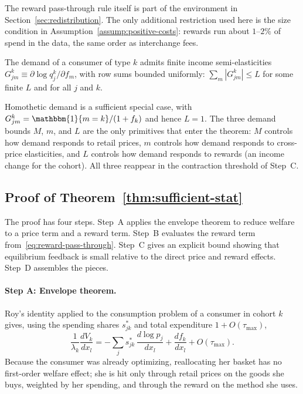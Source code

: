 \documentclass[main.tex]{subfiles}
\begin{document}
The reward pass-through rule itself is part of the environment in Section~\ref{sec:redistribution}.
The only additional restriction used here is the size condition in Assumption~\ref{assump:positive-costs}: rewards run about $1$--$2\%$ of spend in the data, the same order as interchange fees.

\begin{assumption}\label{assump:income-elasticity}
The demand of a consumer of type $k$ admits finite income semi-elasticities $G^k_{jm}\equiv\partial\log q^k_j/\partial f_m$, with row sums bounded uniformly: $\sum_m|G^k_{jm}|\leq L$ for some finite $L$ and for all $j$ and $k$.
\end{assumption}

Homothetic demand is a sufficient special case, with $G^k_{jm}=\mathbbm{1}\{m=k\}/(1+f_k)$ and hence $L=1$.
The three demand bounds $M$, $m$, and $L$ are the only primitives that enter the theorem: $M$ controls how demand responds to retail prices, $m$ controls how demand responds to cross-price elasticities, and $L$ controls how demand responds to rewards (an income change for the cohort).
All three reappear in the contraction threshold of Step~C.

\subsection{Proof of Theorem~\ref{thm:sufficient-stat}}\label{subsec:proof-theorem1}

The proof has four steps.
Step~A applies the envelope theorem to reduce welfare to a price term and a reward term.
Step~B evaluates the reward term from~\eqref{eq:reward-pass-through}.
Step~C gives an explicit bound showing that equilibrium feedback is small relative to the direct price and reward effects.
Step~D assembles the pieces.

\paragraph{Step A: Envelope theorem.}
Roy's identity applied to the consumption problem of a consumer in cohort $k$ gives, using the spending shares $s^*_{jk}$ and total expenditure $1+O(\tau_{\max})$,
\begin{equation}
\frac{1}{\lambda_k}\frac{dV_k}{dx_l}=-\sum_j s^*_{jk}\,\frac{d\log p_j}{dx_l}+\frac{df_k}{dx_l}+O(\tau_{\max}).
\label{eq:cohort-roy}
\end{equation}
Because the consumer was already optimizing, reallocating her basket has no first-order welfare effect; she is hit only through retail prices on the goods she buys, weighted by her spending, and through the reward on the method she uses.
\end{document}
